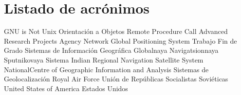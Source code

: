 \chapter{Listado de acrónimos}

{\small
\begin{acronym}[XXXXXXXX]
  		{\acs{GNU} is Not Unix}
  			{Orientación a Objetos}
  		{Remote Procedure Call}
  	{Advanced Research Projects Agency Network}
  		{Global Positioning System}
  		{Trabajo Fin de Grado}
  		{Sistemas de Información Geográfica}
  	{Globalnaya Navigatsionnaya Sputnikovaya Sistema}
  		{Indian Regional Navigation Satellite System}
  		{NationalCentre of Geographic Information and Analysis}
  			{Sistemas de Geolocalización}
  		{Royal Air Force}
  		{Unión de Repúblicas Socialistas Soviéticas}
  		{United States of America}
  		{Estados Unidos}
\end{acronym}
}




